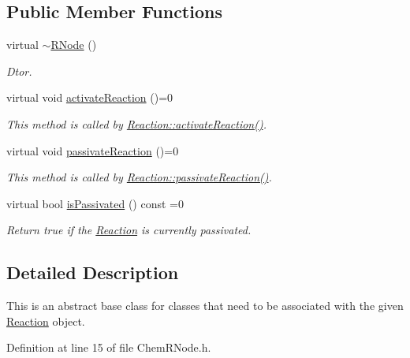 \subsection*{Public Member Functions}
\begin{DoxyCompactItemize}
\item 
virtual \hyperlink{classchem_1_1RNode_af39a9d08d697b5586dad42ce763b902d}{$\sim$\-R\-Node} ()
\begin{DoxyCompactList}\small\item\em Dtor. \end{DoxyCompactList}\item 
virtual void \hyperlink{classchem_1_1RNode_a979370f4102fdfda1ee562788318b556}{activate\-Reaction} ()=0
\begin{DoxyCompactList}\small\item\em This method is called by \hyperlink{classchem_1_1Reaction_afae5d992f176c16a21ec38fcf3d83649}{Reaction\-::activate\-Reaction()}. \end{DoxyCompactList}\item 
virtual void \hyperlink{classchem_1_1RNode_a007a65ede4d89e562929fc0ae9df5661}{passivate\-Reaction} ()=0
\begin{DoxyCompactList}\small\item\em This method is called by \hyperlink{classchem_1_1Reaction_a6990bf5dfc31f04bcab6bda8392174aa}{Reaction\-::passivate\-Reaction()}. \end{DoxyCompactList}\item 
virtual bool \hyperlink{classchem_1_1RNode_a30bdb95406ebc217c1a732bf36883b3f}{is\-Passivated} () const =0
\begin{DoxyCompactList}\small\item\em Return true if the \hyperlink{classchem_1_1Reaction}{Reaction} is currently passivated. \end{DoxyCompactList}\end{DoxyCompactItemize}


\subsection{Detailed Description}
This is an abstract base class for classes that need to be associated with the given \hyperlink{classchem_1_1Reaction}{Reaction} object. 

Definition at line 15 of file Chem\-R\-Node.\-h.



